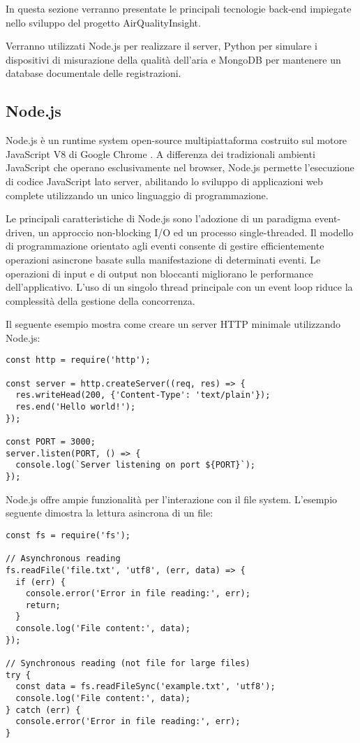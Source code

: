 In questa sezione verranno presentate le principali tecnologie back-end impiegate nello sviluppo del progetto AirQualityInsight.

Verranno utilizzati Node.js per realizzare il server, Python per simulare i dispositivi di misurazione della qualità dell'aria e MongoDB per mantenere un database documentale delle registrazioni.

\subsection{Node.js}

Node.js è un runtime system open-source multipiattaforma costruito sul motore JavaScript V8 di Google Chrome \citep{capan_2013_nodejs}. A differenza dei tradizionali ambienti JavaScript che operano esclusivamente nel browser, Node.js permette l'esecuzione di codice JavaScript lato server, abilitando lo sviluppo di applicazioni web complete utilizzando un unico linguaggio di programmazione.

Le principali caratteristiche di Node.js sono l'adozione di un paradigma event-driven, un approccio non-blocking I/O ed un processo single-threaded. Il modello di programmazione orientato agli eventi consente di gestire efficientemente operazioni asincrone basate sulla manifestazione di determinati eventi. Le operazioni di input e di output non bloccanti migliorano le performance dell'applicativo. L'uso di un singolo thread principale con un event loop riduce la complessità della gestione della concorrenza.

Il seguente esempio mostra come creare un server HTTP minimale utilizzando Node.js:

\begin{lstlisting}[caption={Server HTTP base in Node.js}]
const http = require('http');

const server = http.createServer((req, res) => {
  res.writeHead(200, {'Content-Type': 'text/plain'});
  res.end('Hello world!');
});

const PORT = 3000;
server.listen(PORT, () => {
  console.log(`Server listening on port ${PORT}`);
});
\end{lstlisting}

Node.js offre ampie funzionalità per l'interazione con il file system. L'esempio seguente dimostra la lettura asincrona di un file:

\begin{lstlisting}[caption={Lettura asincrona di file}]
const fs = require('fs');

// Asynchronous reading
fs.readFile('file.txt', 'utf8', (err, data) => {
  if (err) {
    console.error('Error in file reading:', err);
    return;
  }
  console.log('File content:', data);
});

// Synchronous reading (not file for large files)
try {
  const data = fs.readFileSync('example.txt', 'utf8');
  console.log('File content:', data);
} catch (err) {
  console.error('Error in file reading:', err);
}
\end{lstlisting}

